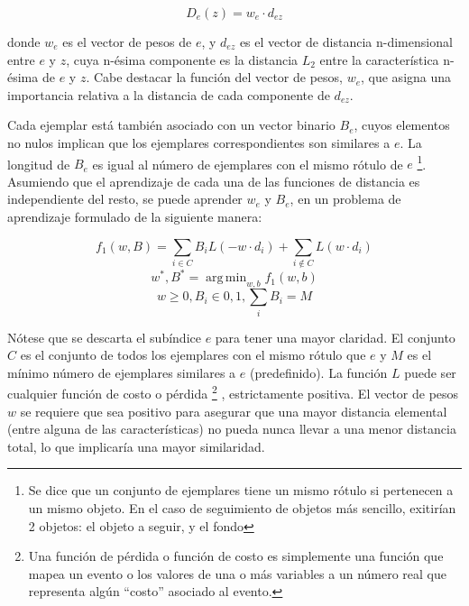 \documentclass[a4paper,10pt]{article}
\DeclareMathOperator*{\argmin}{arg\,min}
\begin{document}
\begin{equation}
    \label{eq:distance-exemplar}
    D_{e}(z) = w_{e} \cdot d_{ez}
\end{equation}

donde $w_{e}$ es el vector de pesos de $e$, y $d_{ez}$ es el vector de distancia
n-dimensional entre $e$ y $z$, cuya n-ésima componente es la distancia $L_{2}$
entre la característica n-ésima de $e$ y $z$. Cabe destacar la función del vector de pesos, $w_{e}$,
que asigna una importancia relativa a la distancia de cada componente de $d_{ez}$.

Cada ejemplar está también asociado con un vector binario $B_{e}$, cuyos elementos
no nulos implican que los ejemplares correspondientes son similares a $e$. La
longitud de $B_{e}$ es igual al número de ejemplares con el mismo rótulo de $e$
\footnote{Se dice que un conjunto de ejemplares tiene un mismo rótulo si pertenecen a un mismo objeto. En el caso de seguimiento de objetos
más sencillo, exitirían 2 objetos: el objeto a seguir, y el fondo}.
Asumiendo que el aprendizaje de cada una de las funciones de distancia es
independiente del resto, se puede aprender $w_{e}$ y $B_{e}$, en un problema
de aprendizaje formulado de la siguiente manera:

\begin{equation}
    \label{eq:learning-problem}
    f_{1}(w,B) = \sum_{i \in C} B_{i}L(-w \cdot d_{i}) + \sum_{i\notin C}L(w \cdot d_{i})
\end{equation}
\begin{equation}
    {w^{*}, B^{*} = \argmin_{w,b} f_{1} (w,b) }
\end{equation}
\begin{equation}
   w \geq 0, B_{i} \in {0,1}, \sum_{i} B_{i} = M
\end{equation}

Nótese que se descarta el subíndice $e$ para tener una mayor claridad.
El conjunto $C$ es el conjunto de todos los ejemplares con el mismo rótulo que $e$ y $M$
es el mínimo número de ejemplares similares a $e$ (predefinido). La función $L$ puede ser
cualquier función de costo o pérdida
\footnote{Una función de pérdida o función de costo es simplemente una función que mapea un evento o los valores de una o más variables
a un número real que representa algún ``costo'' asociado al evento.}
, estrictamente positiva.
El vector de pesos $w$
se requiere que sea positivo para asegurar que una mayor distancia elemental (entre
alguna de las características) no pueda nunca llevar a una menor distancia total,
lo que implicaría una mayor similaridad.
\end{document}
